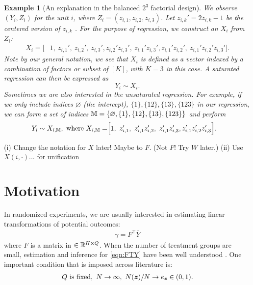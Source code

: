 \documentclass[12pt]{article}
\newtheorem{example}{Example}
\begin{document}
\begin{example}[An explanation in the balanced $2^3$ factorial design]
We observe $(Y_i, {Z}_i)$ for the unit $i$, where ${Z}_i = (z_{i,1},z_{i,2},z_{i,3})$. Let $z_{i,k}' = 2z_{i,k} - 1$ be the centered version of $z_{i,k} $ .  For the purpose of regression, we construct an ${X}_i$ from ${Z}_i$:
\begin{align*}
{X}_i = \Big[&1, ~z_{i,1}', ~z_{i,2}', ~z_{i,3}',
z_{i,2}'z_{i,3}', ~z_{i,1}'z_{i,3}',  z_{i,1}'z_{i,2}', ~ z_{i,1}'z_{i,2}'z_{i,3}'\Big].
\end{align*}
Note by our general notation, we see that ${X}_i$ is defined as a vector indexed by a combination of factors or subset of $[K]$, with $K=3$ in this case. A saturated regression can then be expressed as 
\[
Y_i \sim {X}_i.
\]
Sometimes we are also interested in the unsaturated regression. For example, if we only include indices $\varnothing$ (the intercept), $\{1\},\{12\},\{13\},\{123\}$ in our regression, we can form a set of indices ${\mathbb{M}}=\{\varnothing, \{1\},\{12\},\{13\},\{123\}\}$ and perform
\begin{align*}
Y_i\sim {X}_{i,{\mathbb{M}}}, \text{ where } {X}_{i,{\mathbb{M}}} = &\Big[1, ~z_{i,1}', ~z_{i,1}'z_{i,2}', ~z_{i,1}'z_{i,3}', z_{i,1}'z_{i,2}'z_{i,3}'\Big].
\end{align*}
\end{example}

{\color{red} (i) Change the notation for $X$ later! Maybe to $F$. (Not $F$! Try $W$ later.) (ii) Use $X(i, \cdot)$... for unification}


\section{Motivation}

In randomized experiments, we are usually interested in estimating linear transformations of potential outcomes:
\begin{align}\label{eqn:FTY}
    \gamma = F^\top \overline{Y}
\end{align}
where $F$ is a matrix in $\in{\mathbb{R}}^{H\times Q}$. When the number of treatment groups are small, estimation and inference for \eqref{eqn:FTY} have been well understood \citep{li2017general, zhao2021regression, zhao2021covariate}. One important condition that is imposed across literature is:
\begin{align}\label{eqn:old-cond}
    Q \text{ is fixed}, ~ N\to\infty, ~N({\boldsymbol{z}})/N \to e_{{\boldsymbol{z}}} \in (0,1).
\end{align}
\end{document}
